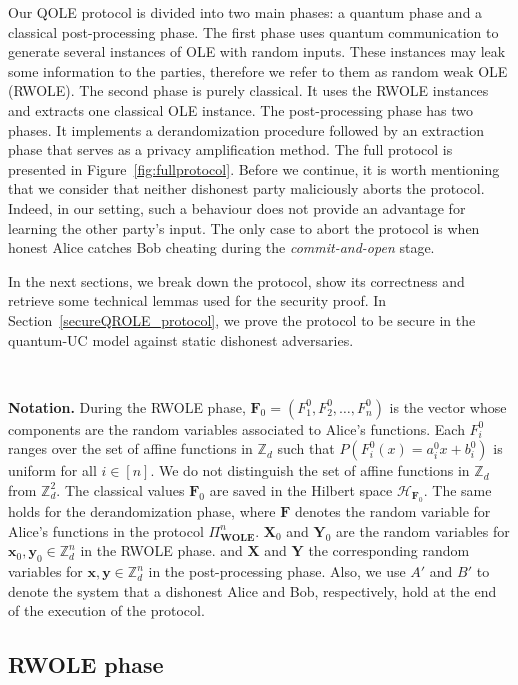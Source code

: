Our QOLE protocol is divided into two main phases: a quantum phase and a classical post-processing phase. The first phase uses quantum communication to generate several instances of OLE with random inputs. These instances may leak some information to the parties, therefore we refer to them as random weak OLE (RWOLE). The second phase is purely classical. It uses the RWOLE instances and extracts one classical OLE instance. The post-processing phase has two phases. It implements a derandomization procedure followed by an extraction phase that serves as a privacy amplification method. The full protocol is presented in Figure~\ref{fig:fullprotocol}.  Before we continue, it is worth mentioning that we consider that neither dishonest party maliciously aborts the protocol. Indeed, in our setting, such a behaviour does not provide an advantage for learning the other party's input. The only case to abort the protocol is when honest Alice catches Bob cheating during the \textit{commit-and-open} stage.  

In the next sections, we break down the protocol, show its correctness and retrieve some technical lemmas used for the security proof. In Section~\ref{secureQROLE_protocol}, we prove the protocol to be secure in the quantum-UC model against static dishonest adversaries.

\

\noindent\textbf{Notation.}  During the RWOLE phase, $\mathbf{F}_0 = (F^0_1,F^0_2 ,\ldots, F^0_n)$ is the vector whose components are the  random variables associated to Alice's functions. Each  $F^0_i$ ranges over the set of affine functions in $\mathbb{Z}_d$ such that $P(F^0_i(x)=a^0_ix+ b^0_i)$ is uniform for all $i\in [n]$. We do not distinguish the set of affine functions in $\mathbb{Z}_d$ from $\mathbb{Z}_d^2$. The classical values $\mathbf{F}_0$ are saved in the Hilbert space $\mathcal{H}_{\mathbf{F}_0}$. The same holds for the derandomization phase, where $\mathbf{F}$ denotes the random variable for Alice's functions in the protocol $\Pi^n_{\textbf{WOLE}}$. $\textbf{X}_0$ and $\textbf{Y}_0$ are the random variables for $\textbf{x}_0, \textbf{y}_0 \in \mathbb{Z}^{ n}_d$  in the RWOLE phase. and $\textbf{X}$ and $\textbf{Y}$ the corresponding random variables for $\textbf{x}, \textbf{y} \in \mathbb{Z}^{n}_d$  in the post-processing phase. Also, we use $A'$ and $B'$ to denote the system that a dishonest Alice and Bob, respectively, hold at the end of the execution of the protocol.


\subsection{RWOLE phase}

